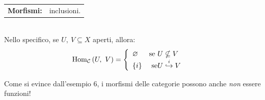 \begin{examples}
\begin{itemize}
\begin{tabular*}{6cm}[t]{>{\bfseries}ll}
Morfismi: & inclusioni.
\end{tabular*}\\
Nello specifico, se $U,\ V\subseteq X$ aperti, allora:
\begin{equation*}
	\mathrm{Hom}_{\mathcal{C}}\left(U,\ V\right)=\begin{cases}
		\begin{array}{ll}
			\varnothing & \text{se } U\nsubseteq V\\
			\left\{i\right\} & \text{ se} U\stackrel{i}{\hookrightarrow} V
		\end{array}
	\end{cases}
\end{equation*}
\end{itemize}
\vspace{-6mm}
\end{examples}
\begin{attention}
	Come si evince dall'esempio 6, i morfismi delle categorie possono anche \textit{non} essere funzioni!
\end{attention}
